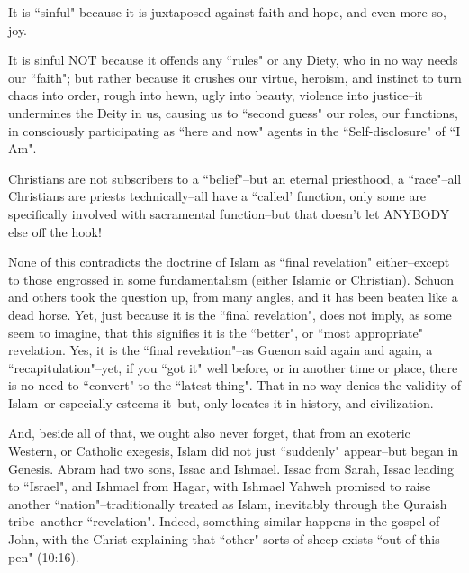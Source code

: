 \begin{footnotesize}
\begin{sffamily}
It is ``sinful" because it is juxtaposed against faith and hope, and even more so, joy.

It is sinful NOT because it offends any ``rules" or any Diety, who in no way needs our ``faith"; but rather because it crushes our virtue, heroism, and instinct to turn chaos into order, rough into hewn, ugly into beauty, violence into justice–it undermines the Deity in us, causing us to ``second guess" our roles, our functions, in consciously participating as ``here and now" agents in the ``Self-disclosure" of ``I Am". 

Christians are not subscribers to a ``belief"–but an eternal priesthood, a ``race"–all Christians are priests technically–all have a ``called' function, only some are specifically involved with sacramental function–but that doesn't let ANYBODY else off the hook! 

None of this contradicts the doctrine of Islam as ``final revelation" either–except to those engrossed in some fundamentalism (either Islamic or Christian). Schuon and others took the question up, from many angles, and it has been beaten like a dead horse. Yet, just because it is the ``final revelation", does not imply, as some seem to imagine, that this signifies it is the ``better", or ``most appropriate" revelation. Yes, it is the ``final revelation"–as Guenon said again and again, a ``recapitulation"–yet, if you ``got it" well before, or in another time or place, there is no need to ``convert" to the ``latest thing". That in no way denies the validity of Islam–or especially esteems it–but, only locates it in history, and civilization. 

And, beside all of that, we ought also never forget, that from an exoteric Western, or Catholic exegesis, Islam did not just ``suddenly" appear–but began in Genesis. Abram had two sons, Issac and Ishmael. Issac from Sarah, Issac leading to ``Israel", and Ishmael from Hagar, with Ishmael Yahweh promised to raise another ``nation"–traditionally treated as Islam, inevitably through the Quraish tribe–another ``revelation". Indeed, something similar happens in the gospel of John, with the Christ explaining that ``other" sorts of sheep exists ``out of this pen" (10:16).


\hfill


\end{sffamily}\end{footnotesize}

